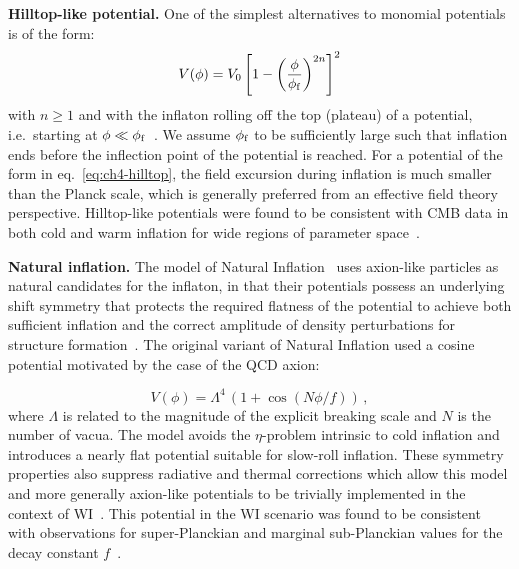 {\bf Hilltop-like potential.} One of the simplest alternatives to monomial potentials is of the form:
\begin{equation}
    V(\phi)=V_0\left[1-\left(\frac{\phi}{\phi_{\rm{f}}}\right)^{2n}\right]^{2}
    \label{eq:ch4-hilltop}
\end{equation}
with $n\geq 1$ and with the inflaton rolling off the top (plateau) of a potential, i.e.\ starting at $\phi\ll \phi_{\rm f}$~\cite{Boubekeur:2005zm}.  We assume  $\phi_{\rm f}$ to be sufficiently large such that inflation ends before the inflection point of the potential is reached. For a potential of the form in eq.~\eqref{eq:ch4-hilltop}, the field excursion during inflation is much smaller than the Planck scale, which is generally preferred from an effective field theory perspective. Hilltop-like potentials were found to be consistent with CMB data in both cold and warm inflation for wide regions of parameter space~\cite{Bartrum:2013oka,Benetti:2016jhf}.

{\bf Natural inflation.}  The model of Natural Inflation~\cite{Freese:1990rb} uses axion-like particles as natural candidates for the inflaton, in that their potentials possess an underlying shift symmetry that protects the required flatness of the potential to achieve both sufficient inflation and the correct amplitude of density perturbations for structure formation~\cite{Adams:1990pn,Montefalcone:2022owy}.  The original variant of Natural Inflation used a cosine potential  motivated by the case of the QCD axion:

\begin{equation}
    \label{eq:ch4-natural_potential}
    V(\phi)= \Lambda^4\,\left(1+\cos(N\phi/f)\right)\,,
\end{equation}
where $\Lambda$ is related to the magnitude of the explicit breaking scale and $N$ is the number of vacua. The model avoids the $\eta$-problem intrinsic to cold inflation and introduces a nearly flat potential suitable for slow-roll inflation. These symmetry properties also suppress radiative and thermal corrections which allow this model and more generally axion-like potentials to be trivially implemented in the context of WI~\cite{Visinelli:2011jy, Mishra:2011vh,Kamali:2019ppi,Berghaus:2019whh}. This potential in the WI scenario was found to be consistent with observations for super-Planckian and marginal sub-Planckian values for the
decay constant $f$~\cite{Correa:2022ngq,Montefalcone:2022jfw}.


